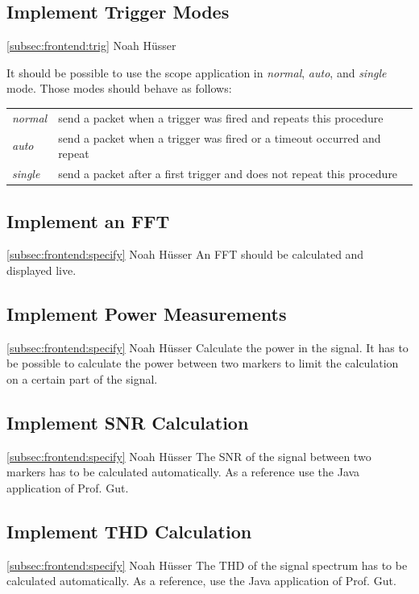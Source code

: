 \documentclass[a4paper,oneside]{alpenspecs/alpenspecs}
\begin{document}
\subsection{Implement Trigger Modes}
\label{subsec:frontend:modes}
\wpac
    {}
    {}
    {}
    {\ref{subsec:frontend:trig}}
    {}
    {Noah Hüsser}
    {%
        It should be possible to use the scope application in \textit{normal},
        \textit{auto}, and \textit{single} mode. Those modes should behave as follows:
        \begin{tabular}{l l}
        \textit{normal} & send a packet when a trigger was fired and repeats this procedure \\
        \textit{auto} & send a packet when a trigger was fired or a timeout occurred and repeat \\
        \textit{single} & send a packet after a first trigger and does not repeat this procedure
        \end{tabular}
    }

\subsection{Implement an FFT}
\label{subsec:frontend:fft}
\wpac
    {}
    {}
    {}
    {\ref{subsec:frontend:specify}}
    {}
    {Noah Hüsser}
    {%
        An FFT should be calculated and displayed live.
    }

\subsection{Implement Power Measurements}
\label{subsec:frontend:}
\wpac
    {}
    {}
    {}
    {\ref{subsec:frontend:specify}}
    {}
    {Noah Hüsser}
    {%
        Calculate the power in the signal.
        It has  to be possible to  calculate the power between  two markers to
        limit the calculation on a certain part of the signal.
    }

\subsection{Implement SNR Calculation}
\label{subsec:frontend:}
\wpac
    {}
    {}
    {}
    {\ref{subsec:frontend:specify}}
    {}
    {Noah Hüsser}
    {%
        The SNR of the signal between two markers has to be calculated automatically.
        As a reference use the Java application of Prof. Gut.
    }

\subsection{Implement THD Calculation}
\label{subsec:frontend:}
\wpac
    {}
    {}
    {}
    {\ref{subsec:frontend:specify}}
    {}
    {Noah Hüsser}
    {%
        The THD of the signal spectrum has to be calculated automatically.
        As a reference, use the Java application of Prof. Gut.
    }
\end{document}
